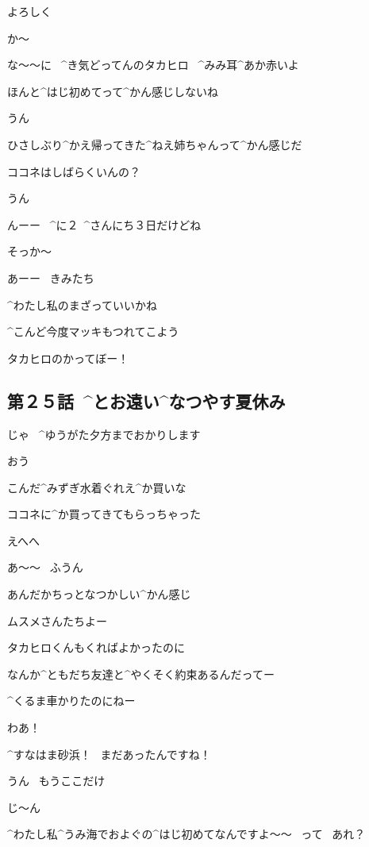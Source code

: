 \Takahiro よろしく

\Alpha か〜

\Alpha な〜〜に
\ ^{き}{気}どってんのタカヒロ
\ ^{みみ}{耳}^{あか}{赤}いよ

\page
\Kokone ほんと^{はじ}{初}めてって^{かん}{感}じしないね

\Takahiro うん

\Takahiro ひさしぶり^{かえ}{帰}ってきた^{ねえ}{姉}ちゃんって^{かん}{感}じだ

\Takahiro ココネはしばらくいんの？

\Kokone うん

\Kokone んーー
\ ^{に}{２}\ ^{さんにち}{３日}だけどね

\Takahiro そっか〜

\Alpha あーー
\ きみたち

\Alpha ^{わたし}{私}のまざっていいかね

\page
\Takahiro ^{こんど}{今度}マッキもつれてこよう

\Makki タカヒロのかってぼー！


\subsection{第２５話\ ^{とお}{遠}い^{なつやす}{夏休}み}

\page[20]
\Alpha じゃ
\ ^{ゆうがた}{夕方}までおかりします

\Ojisan おう

\page
\Ojisan こんだ^{みずぎ}{水着}ぐれえ^{か}{買}いな

\Alpha ココネに^{か}{買}ってきてもらっちゃった

\Alpha えへへ

\Ojisan あ〜〜
\ ふうん

\Ojisan あんだかちっとなつかしい^{かん}{感}じ

\Ojisan ムスメさんたちよー

\page
\Kokone タカヒロくんもくればよかったのに

\Alpha なんか^{ともだち}{友達}と^{やくそく}{約束}あるんだってー

\Alpha ^{くるま}{車}かりたのにねー

\page
\Kokone わあ！

\Kokone ^{すなはま}{砂浜}！
\ まだあったんですね！

\Alpha うん
\ もうここだけ

\page
\Kokone じ〜ん

\Kokone ^{わたし}{私}^{うみ}{海}でおよぐの^{はじ}{初}めてなんですよ〜〜
\ って
\ あれ？

